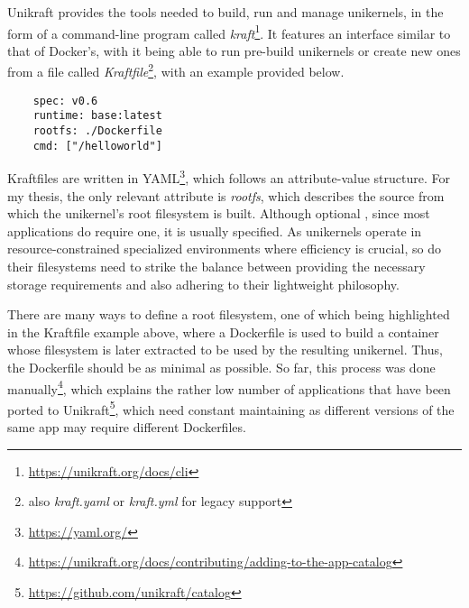 Unikraft provides the tools needed to build, run and manage unikernels, in the form of a command-line program called \textit{kraft}\footnote{\url{https://unikraft.org/docs/cli}}.
It features an interface similar to that of Docker's, with it being able to run pre-build unikernels or create new ones from a file called \textit{Kraftfile}\footnote{also \textit{kraft.yaml} or \textit{kraft.yml} for legacy support},
with an example provided below.

\lstset{language=yaml,caption=Sample Kraftfile,label=lst:ex-kraftfile}
\begin{lstlisting}
    spec: v0.6
    runtime: base:latest
    rootfs: ./Dockerfile
    cmd: ["/helloworld"]  
\end{lstlisting}

Kraftfiles are written in YAML\footnote{\url{https://yaml.org/}}, which follows an attribute-value structure. For my thesis, the only relevant attribute is \textit{rootfs}, which
describes the source from which the unikernel's root filesystem is built. Although optional \cite{unikraft-filesystem}, since most applications do require one, it is usually specified.
As unikernels operate in resource-constrained specialized environments where efficiency is crucial, so do their filesystems need to strike the balance between
providing the necessary storage requirements and also adhering to their lightweight philosophy.

There are many ways to define a root filesystem, one of which being highlighted in the Kraftfile example above, where a Dockerfile is used to build a container whose filesystem is later extracted to be used
by the resulting unikernel. Thus, the Dockerfile should be as minimal as possible. So far, this process was done manually\footnote{
    \url{https://unikraft.org/docs/contributing/adding-to-the-app-catalog}
}, which explains the rather low number of applications that have been ported to Unikraft\footnote{
    \url{https://github.com/unikraft/catalog}
}, which need constant maintaining as different versions of the same app may require different Dockerfiles. 